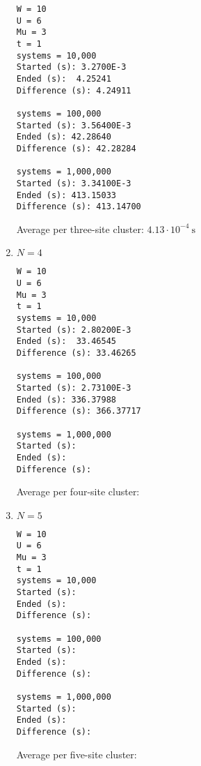 \documentclass[12pt]{article}
\begin{document}
\begin{enumerate}
\begin{lstlisting}
W = 10
U = 6
Mu = 3
t = 1
systems = 10,000
Started (s): 3.2700E-3
Ended (s):  4.25241
Difference (s): 4.24911

systems = 100,000
Started (s): 3.56400E-3
Ended (s): 42.28640
Difference (s): 42.28284

systems = 1,000,000
Started (s): 3.34100E-3
Ended (s): 413.15033
Difference (s): 413.14700
\end{lstlisting}

Average per three-site cluster: $4.13\cdot 10^{-4}~\mbox{s}$ 

\item $N = 4$

\begin{lstlisting}
W = 10
U = 6
Mu = 3
t = 1
systems = 10,000
Started (s): 2.80200E-3
Ended (s):  33.46545
Difference (s): 33.46265

systems = 100,000
Started (s): 2.73100E-3
Ended (s): 336.37988
Difference (s): 366.37717

systems = 1,000,000
Started (s): 
Ended (s): 
Difference (s): 
\end{lstlisting}

Average per four-site cluster: 

\item $N = 5$

\begin{lstlisting}
W = 10
U = 6
Mu = 3
t = 1
systems = 10,000
Started (s): 
Ended (s):  
Difference (s): 

systems = 100,000
Started (s): 
Ended (s): 
Difference (s): 

systems = 1,000,000
Started (s): 
Ended (s): 
Difference (s): 
\end{lstlisting}

Average per five-site cluster: 

\end{enumerate}
\end{document}
